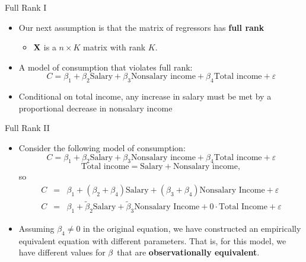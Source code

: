 \documentclass[english,xcolor={dvipsnames},aspectratio=169]{beamer}
\begin{document}
\begin{frame}{Full Rank I}
\begin{itemize}

	\item<1-> Our next assumption is that the matrix of regressors has {\bf full rank}
	\begin{itemize}
		\item<1-> ${\bf X}$ is a $n\times K$ matrix with rank $K$.
	\end{itemize}

	\medskip
	\item<2-> A model of consumption that violates full rank:\[ 
	C = \beta_1 + \beta_2 \text{Salary} + \beta_3 \text{Nonsalary income} + \beta_4 \text{Total income} + \varepsilon
	\]

	\medskip
	\item<3-> Conditional on total income, any increase in salary must be met by a proportional decrease
	in nonsalary income


\end{itemize}
\end{frame}

\begin{frame}{Full Rank II}
\begin{itemize}

	\item Consider the following model of consumption:\[ 
	C = \beta_1 + \beta_2 \text{Salary} + \beta_3 \text{Nonsalary income} + \beta_4 \text{Total income} + \varepsilon
	\]
	\smallskip
\[
	\text{Total income}  = \text{Salary} + \text{Nonsalary income},
	\]
	so\[
\begin{array}{ccl}
C & = & \beta_{1}+\left(\beta_{2}+\beta_{4}\right)\text{Salary}+\left(\beta_{3}+\beta_{4}\right)\text{Nonsalary Income}+\varepsilon\\
C & = & \beta_{1}+\widetilde{\beta}_{2}\text{Salary}+\widetilde{\beta}_{3}\text{Nonsalary Income}+0\cdot\text{Total Income}+\varepsilon
\end{array}
\]

	\smallskip
	\item Assuming $\beta_{4}\ne 0$ in the original equation, we have constructed an empirically equivalent equation with different parameters.
         That is, for this model, we have different values for ${\bold \beta }$ that are {\bf observationally equivalent}. 

\end{itemize}
\end{frame}
\end{document}
